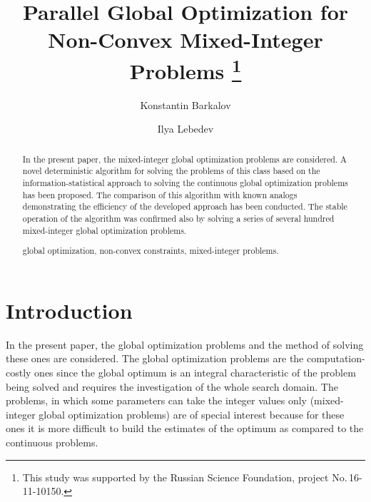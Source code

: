 \documentclass{llncs}
\begin{document}
\mainmatter 

\title{Parallel Global Optimization for Non-Convex Mixed-Integer Problems
\thanks{This study was supported by the Russian Science Foundation, 
project No.\,16-11-10150.}}
\author{Konstantin Barkalov \and Ilya Lebedev %
\\
}


\maketitle

\begin{abstract}
In the present paper, the mixed-integer global optimization problems are considered. A novel 
deterministic algorithm for solving the problems of this class based on the information-statistical 
approach to solving the continuous global optimization problems has been proposed. The 
comparison of this algorithm with known analogs demonstrating the efficiency of the 
developed approach has been conducted. The stable operation of the algorithm was confirmed 
also by solving a series of several hundred mixed-integer global optimization problems. 

\keywords global optimization, non-convex constraints, mixed-integer problems.

\end{abstract}

\section{Introduction}\label{sec:intro}

In the present paper, the global optimization problems and the method of solving these ones are 
considered. The global optimization problems are the computation-costly ones since the global 
optimum is an integral characteristic of the problem being solved and requires the investigation 
of the whole search domain. 
The problems, in which some parameters can take the integer values only (mixed-integer global 
optimization problems) are of special interest because for these ones it is more difficult to build 
the estimates of the optimum as compared to the continuous problems.
\end{document}
